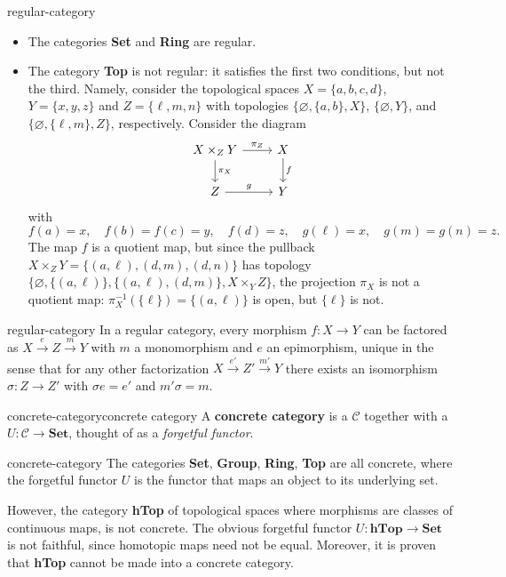 \begin{example}{regular-category}
    \begin{itemize}
        \item The categories \textbf{Set} and \textbf{Ring} are regular.
        \item The category \textbf{Top} is not regular: it satisfies the first two conditions, but not the third. Namely, consider the topological spaces $X = \{ a, b, c, d \}$, $Y = \{ x, y, z \}$ and $Z = \{ \ell, m, n \}$ with topologies $\{ \varnothing, \{ a, b \}, X \}$, $\{ \varnothing, Y \}$, and $\{ \varnothing, \{ \ell, m \}, Z \}$, respectively. Consider the diagram
        \[ \svg \begin{tikzcd} X \times_Z Y \arrow{r}{\pi_Z} \arrow{d}{\pi_X} & X \arrow{d}{f} \\ Z \arrow{r}{g} & Y \end{tikzcd} \]
        with
        \[ f(a) = x, \quad f(b) = f(c) = y, \quad f(d) = z, \quad g(\ell) = x, \quad g(m) = g(n) = z . \]
        The map $f$ is a quotient map, but since the pullback $X \times_Z Y = \{ (a, \ell), (d, m), (d, n) \}$ has topology $\{ \varnothing, \{ (a, \ell) \}, \{ (a, \ell), (d, m) \} , X \times_Y Z \}$, the projection $\pi_X$ is not a quotient map: $\pi_X^{-1}(\{ \ell \}) = \{ (a, \ell) \}$ is open, but $\{ \ell \}$ is not.
    \end{itemize}
\end{example}

\begin{example}{regular-category}
    In a regular category, every morphism $f \colon X \to Y$ can be factored as $X \xrightarrow{e} Z \xrightarrow{m} Y$ with $m$ a monomorphism and $e$ an epimorphism, unique in the sense that for any other factorization $X \xrightarrow{e'} Z' \xrightarrow{m'} Y$ there exists an isomorphism $\sigma \colon Z \to Z'$ with $\sigma e = e'$ and $m' \sigma = m$.
\end{example}

\begin{topic}{concrete-category}{concrete category}
    A \textbf{concrete category} is a  $\mathcal{C}$ together with a  $U \colon \mathcal{C} \to \textbf{Set}$, thought of as a \textit{forgetful functor}.
\end{topic}

\begin{example}{concrete-category}
    The categories \textbf{Set}, \textbf{Group}, \textbf{Ring}, \textbf{Top} are all concrete, where the forgetful functor $U$ is the functor that maps an object to its underlying set.
    
    However, the category \textbf{hTop} of topological spaces where morphisms are  classes of continuous maps, is not concrete. The obvious forgetful functor $U \colon \textbf{hTop} \to \textbf{Set}$ is not faithful, since homotopic maps need not be equal. Moreover, it is proven that \textbf{hTop} cannot be made into a concrete category.
\end{example}

